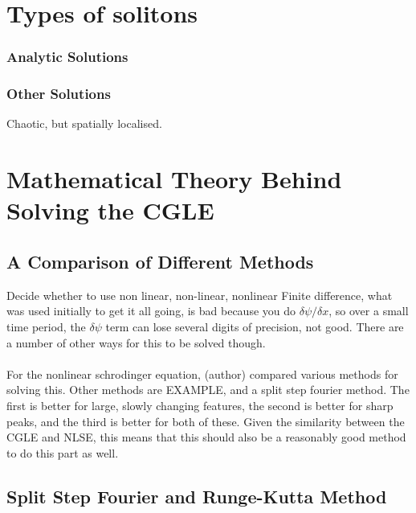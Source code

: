 \documentclass[a4paper,12pt]{report}
\begin{document}
\chapter{Types of solitons}
\subsection{Analytic Solutions}

\subsection{Other Solutions}
Chaotic, but spatially localised.











\chapter{Mathematical Theory Behind Solving the CGLE}
\section{A Comparison of Different Methods}
Decide whether to use non linear, non-linear, nonlinear
Finite difference, what was used initially to get it all going, is bad because you do $\delta \psi / \delta x$, so over a small time period, the $\delta \psi$ term can lose several digits of precision, not good. There are a number of other ways for this to be solved though. 
\\\\

For the nonlinear schrodinger equation, (author) compared various methods for solving this. 
Other methods are EXAMPLE, and a split step fourier method. The first is better for large, slowly changing features, the second is better for sharp peaks, and the third is better for both of these.
Given the similarity between the CGLE and NLSE, this means that this should also be a reasonably good method to do this part as well. 

\section{Split Step Fourier and Runge-Kutta Method}
\end{document}
